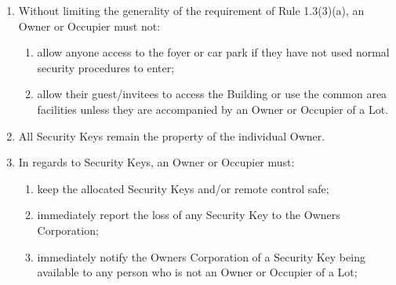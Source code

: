 \documentclass{article}
\begin{document}
\begin{enumerate}[label=\arabic*.]
\begin{enumerate}[label=\arabic{enumi}.\arabic*.]
\begin{enumerate}[label=(\arabic*)]
\begin{enumerate}[label=(\alph*)]
\item  ensure that all fire and security doors, gates and other doors are properly closed after use;

\item  not do anything that may interfere with the security or safety of the Common Property or a Lot;

\item  not interfere with any closed-circuit television monitoring devices, audio-visual cameras and other audio-visual surveillance devices; and

\item  not do (or permit to be done) anything that may harm the security or safety of the Common Property or any fellow Lot Owner or Occupier or their pets in or around the Building.

\end{enumerate}

\item  Without limiting the generality of the requirement of Rule 1.3(3)(a), an Owner or Occupier must not:

\begin{enumerate}[label=(\alph*)]

\item  allow anyone access to the foyer or car park if they have not used normal security procedures to enter;

\item  allow their guest/invitees to access the Building or use the common area facilities unless they are accompanied by an Owner or Occupier of a Lot.

\end{enumerate}

\item  All Security Keys remain the property of the individual Owner.

\item In regards to Security Keys, an Owner or Occupier must:

\begin{enumerate}[label=(\alph*)]

\item  keep the allocated Security Keys and/or remote control safe;

\item  immediately report the loss of any Security Key to the Owners Corporation;

\item  immediately notify the Owners Corporation of a Security Key being available to any person who is not an Owner or Occupier of a Lot;


\end{enumerate}
\end{enumerate}
\end{enumerate}
\end{enumerate}
\end{document}
